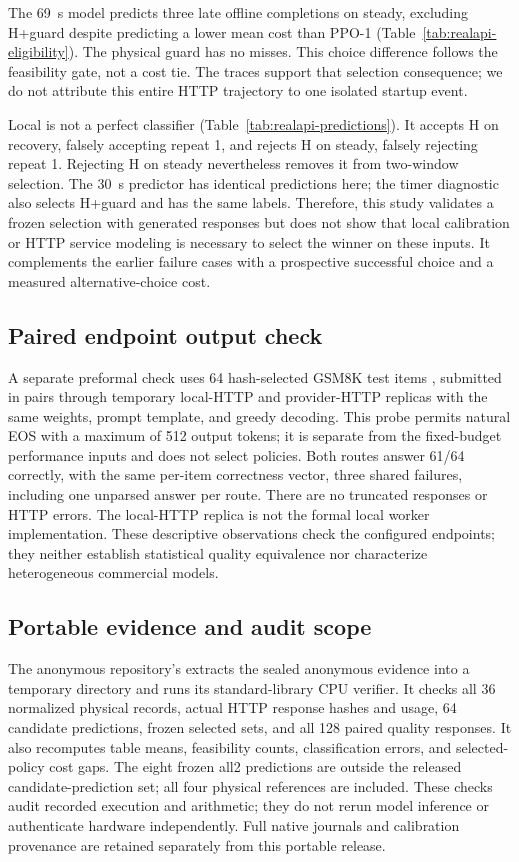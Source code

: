 The 69~s model predicts three late offline completions on steady, excluding
H+guard despite predicting a lower mean cost than PPO-1
(Table~\ref{tab:realapi-eligibility}). The physical guard has no misses. This
choice difference follows the feasibility gate, not a cost tie. The traces
support that selection consequence; we do not attribute this entire HTTP
trajectory to one isolated startup event.

Local is not a perfect classifier (Table~\ref{tab:realapi-predictions}). It
accepts H on recovery, falsely accepting repeat 1, and rejects H on steady,
falsely rejecting repeat 1. Rejecting H on steady nevertheless removes it
from two-window selection. The 30~s predictor has identical predictions here;
the timer diagnostic also selects H+guard and has the same labels. Therefore,
this study validates a frozen selection with generated responses but does
not show that local calibration or HTTP service modeling is necessary to
select the winner on these inputs. It complements the earlier failure cases
with a prospective successful choice and a measured alternative-choice cost.

\subsection{Paired endpoint output check}
A separate preformal check uses 64 hash-selected GSM8K test items
\citep{cobbe2021gsm8k}, submitted in pairs through temporary local-HTTP and
provider-HTTP replicas with the same weights, prompt template, and greedy
decoding. This probe permits natural EOS with a maximum of 512 output tokens;
it is separate from the fixed-budget performance inputs and does not select
policies. Both routes answer 61/64 correctly, with the same per-item correctness
vector, three shared failures, including one unparsed answer per route.
There are no truncated responses or HTTP errors. The local-HTTP replica is
not the formal local worker implementation. These descriptive observations
check the configured endpoints; they neither establish statistical quality
equivalence nor characterize heterogeneous commercial models.

\subsection{Portable evidence and audit scope}
The anonymous repository's  extracts the sealed
anonymous evidence into a temporary directory and runs its standard-library
CPU verifier. It checks all 36 normalized physical records, actual HTTP
response hashes and usage, 64 candidate predictions, frozen selected sets,
and all 128 paired quality responses. It also recomputes table means,
feasibility counts, classification errors, and selected-policy cost gaps.
The eight frozen all2 predictions are outside the released candidate-prediction
set; all four physical references are included. These checks audit recorded
execution and arithmetic; they do not rerun model inference or authenticate
hardware independently. Full native journals and calibration provenance are
retained separately from this portable release.
